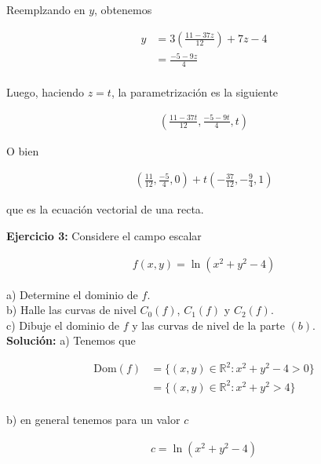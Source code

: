 \documentclass{article}
\theoremstyle{definition}
\begin{document}
Reemplzando en $y$, obtenemos 

\begin{align*}
    y &=3\left( \frac{11-37z}{12} \right)+7z-4 \\
    &= \frac{-5-9z}{4} \\
\end{align*}

Luego, haciendo $z=t$, la parametrización es la siguiente


\begin{align*}
    \left(  \frac{11-37t}{12}, \frac{-5-9t}{4}, t\right) 
\end{align*}

O bien

\begin{align*}
    \left(  \frac{11}{12}, \frac{-5}{4}, 0\right) +t \left( -\frac{37}{12}, -\frac{9}{4},1\right) 
\end{align*}

que es la ecuación vectorial de una recta.











\newpage

\textbf{Ejercicio 3:} Considere el campo escalar

\begin{align*}
    f(x,y) = \ln(x^2+y^2-4)
\end{align*}

a) Determine el dominio de $f$. \\

b) Halle las curvas de nivel  $C_0(f)$, $C_1(f)$ y $C_2(f)$. \\

c) Dibuje el dominio de $f$ y las curvas de nivel de la parte $(b)$. \\


\textbf{Solución:} a) Tenemos que

\begin{align*}
    \text{Dom}(f) &= \lbrace (x,y) \in \mathbb{R}^2 : x^2+y^2-4 > 0 \rbrace \\
    &= \lbrace (x,y) \in \mathbb{R}^2 : x^2+y^2> 4 \rbrace \\
\end{align*}


b) en general tenemos para un valor $c$

\begin{align*}
    c= \ln(x^2+y^2-4)
\end{align*}
\end{document}
